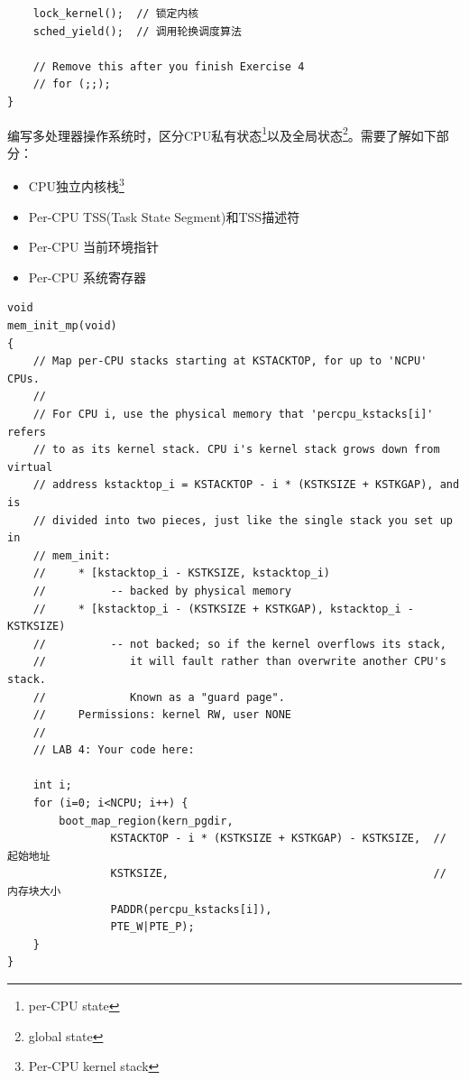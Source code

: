\begin{ExerciseList}
\begin{verbatim}
    lock_kernel();  // 锁定内核
    sched_yield();  // 调用轮换调度算法

    // Remove this after you finish Exercise 4
    // for (;;);
}
\end{verbatim}

编写多处理器操作系统时，区分CPU私有状态\footnote{per-CPU state}以及全局状态\footnote{global state}。需要了解如下部分：

\begin{itemize}
\item CPU独立内核栈\footnote{Per-CPU kernel stack}
\item Per-CPU TSS(Task State Segment)和TSS描述符
\item Per-CPU 当前环境指针
\item Per-CPU 系统寄存器
\end{itemize}


\begin{verbatim}
void
mem_init_mp(void)
{
    // Map per-CPU stacks starting at KSTACKTOP, for up to 'NCPU' CPUs.
    //
    // For CPU i, use the physical memory that 'percpu_kstacks[i]' refers
    // to as its kernel stack. CPU i's kernel stack grows down from virtual
    // address kstacktop_i = KSTACKTOP - i * (KSTKSIZE + KSTKGAP), and is
    // divided into two pieces, just like the single stack you set up in
    // mem_init:
    //     * [kstacktop_i - KSTKSIZE, kstacktop_i)
    //          -- backed by physical memory
    //     * [kstacktop_i - (KSTKSIZE + KSTKGAP), kstacktop_i - KSTKSIZE)
    //          -- not backed; so if the kernel overflows its stack,
    //             it will fault rather than overwrite another CPU's stack.
    //             Known as a "guard page".
    //     Permissions: kernel RW, user NONE
    //
    // LAB 4: Your code here:

    int i;
    for (i=0; i<NCPU; i++) {
        boot_map_region(kern_pgdir,
                KSTACKTOP - i * (KSTKSIZE + KSTKGAP) - KSTKSIZE,  // 起始地址
                KSTKSIZE,                                         // 内存块大小
                PADDR(percpu_kstacks[i]),
                PTE_W|PTE_P);
    }
}
\end{verbatim}



\end{ExerciseList}
